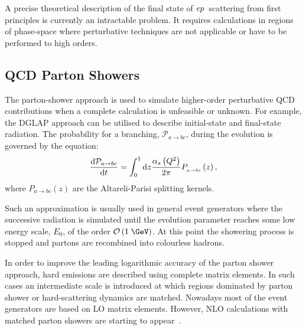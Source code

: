 A precise theoretical description of the final state of $\mbox{$e p$}$~scattering from first principles is currently an intractable problem. It requires calculations in regions of phase-space where perturbative techniques are not applicable or have to be performed to high orders.
\subsection{QCD Parton Showers}
\label{sec:qcdpartonshower}
The parton-shower approach is used to simulate higher-order perturbative QCD contributions when a complete calculation is unfeasible or unknown. For example, the DGLAP approach can be utilised to describe initial-state and final-state radiation. The probability for a branching, $\mathcal{P}_{a\rightarrow bc}$, during the evolution is governed by the equation:
\begin{equation}
\frac{\mathrm{d}\mathcal{P}_{a\rightarrow bc}}{\mathrm{d}t} = \int_0^1{\mathrm{d}z\frac{\mbox{$\alpha_{s}$}\left(\mbox{${Q^2}$}\right)}{2\pi}P_{_{a\rightarrow bc}}}\left(z\right),
\end{equation}
where $P_{a\rightarrow bc}\left(z\right)$ are the Altareli-Parisi splitting kernels.

Such an approximation is usually used in general event generators where the successive radiation is simulated until the evolution parameter reaches some low energy scale, $E_0$, of the order $\mathcal{O}\left(1\;\GeV\right)$. At this point the showering process is stopped and partons are recombined into colourless hadrons.

In order to improve the leading logarithmic accuracy of the parton shower approach, hard emissions are described using complete matrix elements. In such cases an intermediate scale is introduced at which regions dominated by parton shower or hard-scattering dynamics are matched. Nowadays most of the event generators are based on LO matrix elements. However, NLO calculations with matched parton showers are starting to appear~\cite{powheg, mcatnlo}.

